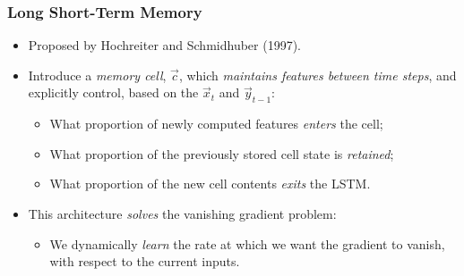\documentclass{beamer}
\begin{document}
\begin{frame}
	\frametitle{Long Short-Term Memory}
	\begin{itemize}
		\item Proposed by Hochreiter and Schmidhuber (1997).
		\vfill
		\item Introduce a \emph{memory cell}, $\vec{c}$, which \emph{maintains features between time steps}, and explicitly control, based on the $\vec{x}_t$ and $\vec{y}_{t-1}$:
		\begin{itemize}
			\item What proportion of newly computed features \emph{enters} the cell;
			\item What proportion of the previously stored cell state is \emph{retained};
			\item What proportion of the new cell contents \emph{exits} the LSTM. 
		\end{itemize}
		\vfill
		\item This architecture \emph{solves} the vanishing gradient problem:
		\begin{itemize}
			\item We dynamically \emph{learn} the rate at which we want the gradient to vanish, with respect to the current inputs.
		\end{itemize}
	\end{itemize}
\end{frame}
\end{document}
